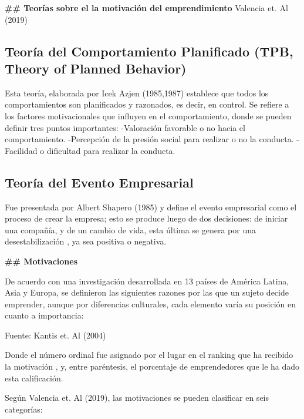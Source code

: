 \documentclass[
  letterpaper,
  DIV=11,
  numbers=noendperiod]{scrreprt}
\begin{document}
\textbf{\#\# Teorías sobre el la motivación del emprendimiento }
Valencia et. Al (2019)

\hypertarget{teoruxeda-del-comportamiento-planificado-tpb-theory-of-planned-behavior}{%
\subsection{Teoría del Comportamiento Planificado (TPB, Theory of
Planned
Behavior)}\label{teoruxeda-del-comportamiento-planificado-tpb-theory-of-planned-behavior}}

Esta teoría, elaborada por Icek Azjen (1985,1987) establece que todos
los comportamientos son planificados y razonados, es decir, en control.
Se refiere a los factores motivacionales que influyen en el
comportamiento, donde se pueden definir tres puntos importantes:
-Valoración favorable o no hacia el comportamiento. -Percepción de la
presión social para realizar o no la conducta. -Facilidad o dificultad
para realizar la conducta.

\hypertarget{teoruxeda-del-evento-empresarial}{%
\subsection{Teoría del Evento
Empresarial}\label{teoruxeda-del-evento-empresarial}}

Fue presentada por Albert Shapero (1985) y define el evento empresarial
como el proceso de crear la empresa; esto se produce luego de dos
decisiones: de iniciar una compañía, y de un cambio de vida, esta última
se genera por una desestabilización , ya sea positiva o negativa.

\textbf{\#\# Motivaciones }

De acuerdo con una investigación desarrollada en 13 países de América
Latina, Asia y Europa, se definieron las siguientes razones por las que
un sujeto decide emprender, aunque por diferencias culturales, cada
elemento varía su posición en cuanto a importancia:

Fuente: Kantis et. Al (2004)

Donde el número ordinal fue asignado por el lugar en el ranking que ha
recibido la motivación , y, entre paréntesis, el porcentaje de
emprendedores que le ha dado esta calificación.

Según Valencia et. Al (2019), las motivaciones se pueden clasificar en
seis categorías:
\end{document}
